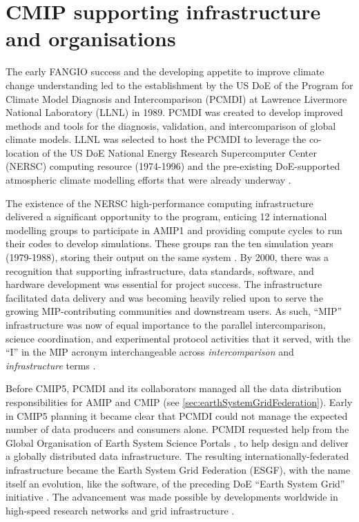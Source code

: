 \documentclass[manuscript]{copernicus}
\begin{document}
\section{CMIP supporting infrastructure and organisations}
\label{sec:CMIPSupportingOrgsAndInfra}

The early FANGIO success and the developing appetite to improve climate change understanding led to the establishment by the US DoE of the Program for Climate Model Diagnosis and Intercomparison (PCMDI) at Lawrence Livermore National Laboratory (LLNL) in 1989. PCMDI was created to develop improved methods and tools for the diagnosis, validation, and intercomparison of global climate models. LLNL was selected to host the PCMDI to leverage the co-location of the US DoE National Energy Research Supercomputer Center (NERSC) computing resource (1974-1996) and the pre-existing DoE-supported atmospheric climate modelling efforts that were already underway \citep[e.g.,][]{maccracken_projecting_1985,potter_celebrating_2011}.

The existence of the NERSC high-performance computing infrastructure delivered a significant opportunity to the program, enticing 12 international modelling groups to participate in AMIP1 and providing compute cycles to run their codes to develop simulations. These groups ran the ten simulation years (1979-1988), storing their output on the same system \citep{gates_amip_1991, gates_amip_1992}. By 2000, there was a recognition that supporting infrastructure, data standards, software, and hardware development was essential for project success. The infrastructure facilitated data delivery and was becoming heavily relied upon to serve the growing MIP-contributing communities and downstream users. As such, ``MIP'' infrastructure was now of equal importance to the parallel intercomparison, science coordination, and experimental protocol activities that it served, with the ``I'' in the MIP acronym interchangeable across \textit{intercomparison} and \emph{infrastructure} terms \citep{gleckler_amip_2001}.

Before CMIP5, PCMDI and its collaborators managed all the data distribution responsibilities for AMIP and CMIP (see \autoref{sec:earthSystemGridFederation}). Early in CMIP5 planning it became clear that PCMDI could not manage the expected number of data producers and consumers alone. PCMDI requested help from the Global Organisation of Earth System Science Portals \citep[GO-ESSP; see][]{williams_earth_2009}, to help design and deliver a globally distributed data infrastructure. The resulting internationally-federated infrastructure became the Earth System Grid Federation (ESGF), with the name itself an evolution, like the software, of the preceding DoE ``Earth System Grid'' initiative \citep[see \autoref{sec:earthSystemGridFederation};][]{williams_earth_2009}.
The advancement was made possible by developments worldwide in high-speed research networks and grid infrastructure \citep{baxevanidis_grids_2002}.
\end{document}
